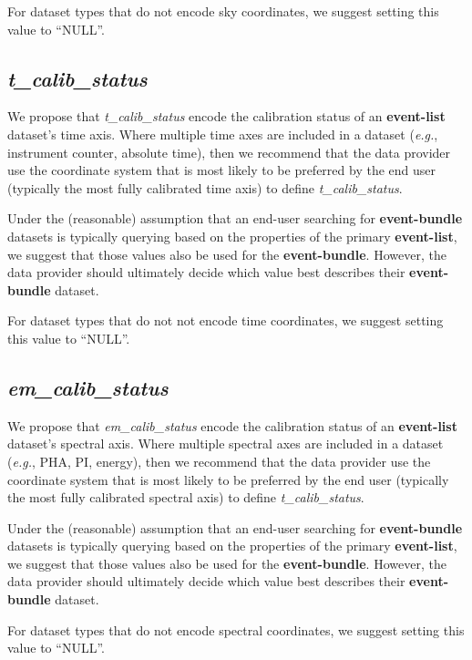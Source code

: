 \documentclass[11pt,a4paper]{ivoa}
\begin{document}
For dataset types that do not encode sky coordinates, we suggest setting this value to ``NULL''.

\subsection{{\em t\_calib\_status}}

We propose that {\em t\_calib\_status} encode the calibration status of an {\bf event-list} dataset's time axis.  Where multiple time axes are included in a dataset ({\em e.g.\/}, instrument counter, absolute time), then we recommend that the data provider use the coordinate system that is most likely to be preferred by the end user (typically the most fully calibrated time axis) to define {\em t\_calib\_status\/}.

Under the (reasonable) assumption that an end-user searching for {\bf event-bundle} datasets is typically querying based on the properties of the primary {\bf event-list}, we suggest that those values also be used for the {\bf event-bundle}.  However, the data provider should ultimately decide which value best describes their {\bf event-bundle} dataset.

For dataset types that do not not encode time coordinates, we suggest setting this value to ``NULL''.

\subsection{{\em em\_calib\_status}}

We propose that {\em em\_calib\_status} encode the calibration status of an {\bf event-list} dataset's spectral axis.  Where multiple spectral axes are included in a dataset ({\em e.g.\/}, PHA, PI, energy), then we recommend that the data provider use the coordinate system that is most likely to be preferred by the end user (typically the most fully calibrated spectral axis) to define {\em t\_calib\_status\/}.

Under the (reasonable) assumption that an end-user searching for {\bf event-bundle} datasets is typically querying based on the properties of the primary {\bf event-list}, we suggest that those values also be used for the {\bf event-bundle}.  However, the data provider should ultimately decide which value best describes their {\bf event-bundle} dataset.

For dataset types that do not encode spectral coordinates, we suggest setting this value to ``NULL''.
\end{document}

